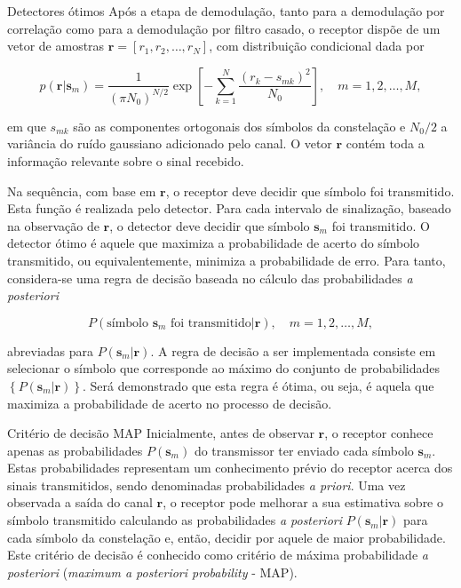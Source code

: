 \documentclass[
  ignorenonframetext,
]{beamer}
\begin{document}
\begin{frame}{Detectores ótimos}
\label{detectores-uxf3timos}
Após a etapa de demodulação, tanto para a demodulação por correlação
como para a demodulação por filtro casado, o receptor dispõe de um vetor
de amostras \(\mathbf{r} = [r_1, r_2, \dots, r_N]\), com distribuição
condicional dada por

\begin{equation}\label{pdf_conj_4}
p\left(\mathbf{r}|\mathbf{s}_m\right)=\frac{1}{\left(\pi N_0\right)^{N/2}} \exp \left[-\sum_{k=1}^N \frac{\left(r_k-s_{m k}\right)^2}{N_0}\right], \quad m=1,2, \ldots, M,
\end{equation}

em que \(s_{m k}\) são as componentes ortogonais dos símbolos da
constelação e \(N_0/2\) a variância do ruído gaussiano adicionado pelo
canal. O vetor \(\mathbf{r}\) contém toda a informação relevante sobre o
sinal recebido.

Na sequência, com base em \(\mathbf{r}\), o receptor deve decidir que
símbolo foi transmitido. Esta função é realizada pelo detector. Para
cada intervalo de sinalização, baseado na observação de \(\mathbf{r}\),
o detector deve decidir que símbolo \(\mathbf{s}_m\) foi transmitido. O
detector ótimo é aquele que maximiza a probabilidade de acerto do
símbolo transmitido, ou equivalentemente, minimiza a probabilidade de
erro. Para tanto, considera-se uma regra de decisão baseada no cálculo
das probabilidades \emph{a posteriori}

\begin{equation}\label{posterior_1}
P\left(\text{símbolo }\mathbf{s}_m \text{ foi transmitido}|\mathbf{r}\right), \quad m=1,2, \ldots, M,
\end{equation}

abreviadas para \(P\left(\mathbf{s}_m|\mathbf{r}\right)\). A regra de
decisão a ser implementada consiste em selecionar o símbolo que
corresponde ao máximo do conjunto de probabilidades
\(\left\lbrace P\left(\mathbf{s}_m|\mathbf{r}\right) \right\rbrace\).
Será demonstrado que esta regra é ótima, ou seja, é aquela que maximiza
a probabilidade de acerto no processo de decisão.

\begin{block}{Critério de decisão MAP}
\label{crituxe9rio-de-decisuxe3o-map}
Inicialmente, antes de observar \(\mathbf{r}\), o receptor conhece
apenas as probabilidades \(P(\mathbf{s}_m)\) do transmissor ter enviado
cada símbolo \(\mathbf{s}_m\). Estas probabilidades representam um
conhecimento prévio do receptor acerca dos sinais transmitidos, sendo
denominadas probabilidades \emph{a priori}. Uma vez observada a saída do
canal \(\mathbf{r}\), o receptor pode melhorar a sua estimativa sobre o
símbolo transmitido calculando as probabilidades \emph{a posteriori}
\(P\left(\mathbf{s}_m|\mathbf{r}\right)\) para cada símbolo da
constelação e, então, decidir por aquele de maior probabilidade. Este
critério de decisão é conhecido como critério de máxima probabilidade
\emph{a posteriori} (\emph{maximum a posteriori probability} - MAP).


\end{block}
\end{frame}
\end{document}
